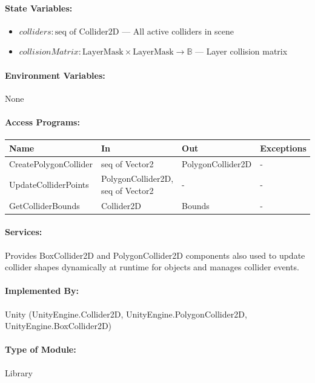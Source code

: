 \documentclass[12pt, titlepage]{article}
\begin{document}
\paragraph{State Variables:}
\begin{itemize}
\item $colliders : \text{seq of Collider2D}$ --- All active colliders in scene
\item $collisionMatrix : \text{LayerMask} \times \text{LayerMask} \rightarrow \mathbb{B}$ --- Layer collision matrix
\end{itemize}

\paragraph{Environment Variables:}
None

\paragraph{Access Programs:}

\begin{center}
\begin{tabular}{p{4cm}p{4cm}p{35mm}p{3cm}}
\toprule
\textbf{Name} & \textbf{In} & \textbf{Out} & \textbf{Exceptions} \\
\midrule
CreatePolygonCollider & seq of Vector2 & PolygonCollider2D & - \\
UpdateColliderPoints & PolygonCollider2D, seq of Vector2 & - & - \\
GetColliderBounds & Collider2D & Bounds & - \\
\bottomrule
\end{tabular}
\end{center}

\paragraph{Services:}
Provides BoxCollider2D and PolygonCollider2D components also used to update collider shapes dynamically at runtime for objects and manages collider events.

\paragraph{Implemented By:}
Unity (UnityEngine.Collider2D, UnityEngine.PolygonCollider2D,
\newline
UnityEngine.BoxCollider2D)

\paragraph{Type of Module:}
Library
\end{document}

